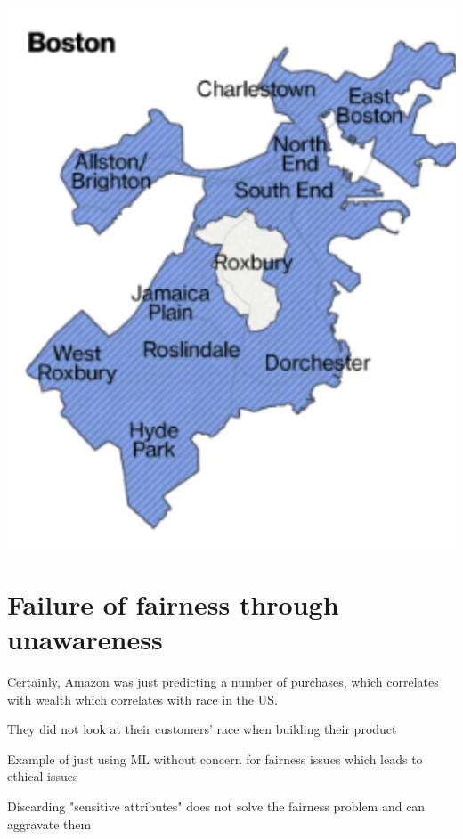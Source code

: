 \documentclass[10pt]{article}
\begin{document}
\begin{center}
\includegraphics[max width=\textwidth]{2024_01_08_7c1a383b1e6170f910e4g-04}
\end{center}

\section*{Failure of fairness through unawareness}
Certainly, Amazon was just predicting a number of purchases, which correlates with wealth which correlates with race in the US.

They did not look at their customers' race when building their product

Example of just using ML without concern for fairness issues which leads to ethical issues

Discarding "sensitive attributes" does not solve the fairness problem and can aggravate them
\end{document}
